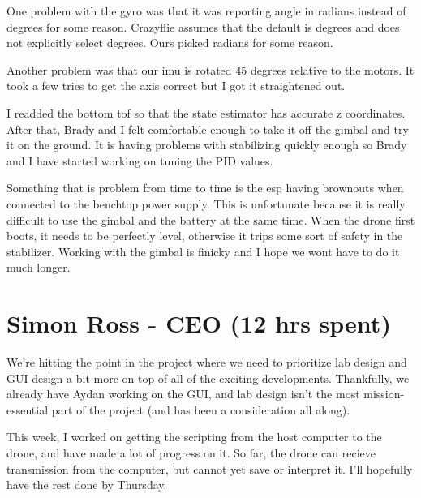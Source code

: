 \documentclass[12pt, titlepage]{article}
\begin{document}
One problem with the gyro was that it was reporting angle in radians instead of degrees for some reason. Crazyflie assumes that the default is degrees and does not explicitly select degrees. Ours picked radians for some reason. 

Another problem was that our imu is rotated 45 degrees relative to the motors. It took a few tries to get the axis correct but I got it straightened out. 

I readded the bottom tof so that the state estimator has accurate z coordinates. After that, Brady and I felt comfortable enough to take it off the gimbal and try it on the ground. It is having problems with stabilizing quickly enough so Brady and I have started working on tuning the PID values. 

Something that is problem from time to time is the esp having brownouts when connected to the benchtop power supply. This is unfortunate because it is really difficult to use the gimbal and the battery at the same time. When the drone first boots, it needs to be perfectly level, otherwise it trips some sort of safety in the stabilizer. Working with the gimbal is finicky and I hope we wont have to do it much longer. 

\section*{Simon Ross - CEO (12 hrs spent)}

We're hitting the point in the project where we need to prioritize lab design and GUI design a bit more on top of all of the exciting developments. Thankfully, we already have Aydan working on the GUI, and lab design isn't the most mission-essential part of the project (and has been a consideration all along). 

This week, I worked on getting the scripting from the host computer to the drone, and have made a lot of progress on it. So far, the drone can recieve transmission from the computer, but cannot yet save or interpret it. I'll hopefully have the rest done by Thursday.
\end{document}
